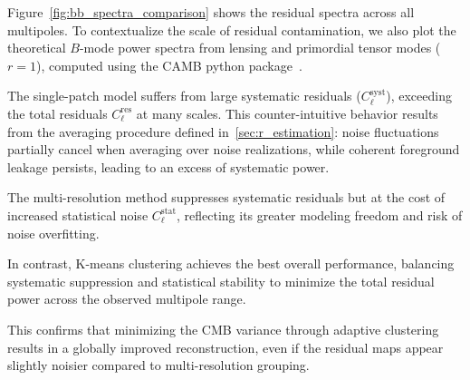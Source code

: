 \documentclass[%
 reprint,
bibnotes,
 amsmath,amssymb,
 aps,
floatfix, 
]{revtex4-2}
\begin{document}
Figure~\ref{fig:bb_spectra_comparison} shows the residual spectra across all multipoles.  
To contextualize the scale of residual contamination, we also plot the theoretical \( B \)-mode power spectra from lensing and primordial tensor modes (\( r=1 \)), computed using the CAMB python package~\citep{CAMB}.

The single-patch model suffers from large systematic residuals (\( C_\ell^{\mathrm{syst}} \)), exceeding the total residuals \( C_\ell^{\mathrm{res}} \) at many scales.  
This counter-intuitive behavior results from the averaging procedure defined in~\ref{sec:r_estimation}: noise fluctuations partially cancel when averaging over noise realizations, while coherent foreground leakage persists, leading to an excess of systematic power.

The multi-resolution method suppresses systematic residuals but at the cost of increased statistical noise \( C_\ell^{\mathrm{stat}} \), reflecting its greater modeling freedom and risk of noise overfitting.

In contrast, K-means clustering achieves the best overall performance, balancing systematic suppression and statistical stability to minimize the total residual power across the observed multipole range.

This confirms that minimizing the CMB variance through adaptive clustering results in a globally improved reconstruction, even if the residual maps appear slightly noisier compared to multi-resolution grouping.
\end{document}
